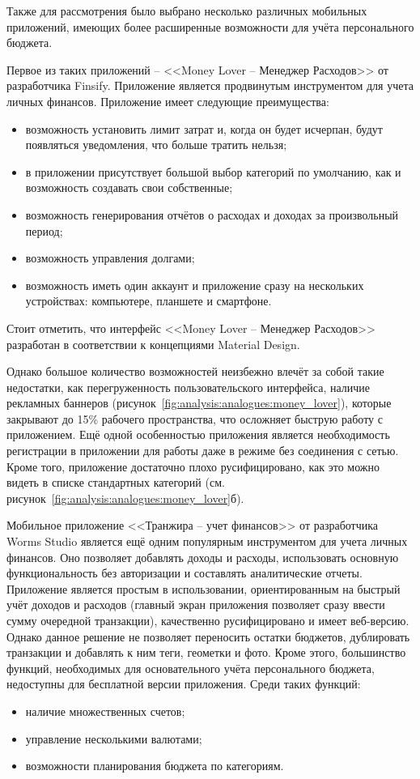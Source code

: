 Также для рассмотрения было выбрано несколько различных мобильных приложений, имеющих более расширенные возможности для учёта персонального бюджета.

Первое из таких приложений -- <<Money Lover -- Менеджер Расходов>> от разработчика Finsify.
Приложение является продвинутым инструментом для учета личных финансов.
Приложение имеет следующие преимущества:
\begin{itemize}
    \item возможность установить лимит затрат и, когда он будет исчерпан, будут появляться уведомления, что больше тратить нельзя;
    \item в приложении присутствует большой выбор категорий по умолчанию, как и возможность создавать свои собственные;
    \item возможность генерирования отчётов о расходах и доходах за произвольный период;
    \item возможность управления долгами;
    \item возможность иметь один аккаунт и приложение сразу на нескольких устройствах: компьютере, планшете и смартфоне.
\end{itemize}

Стоит отметить, что интерфейс <<Money Lover -- Менеджер Расходов>> разработан в соответствии к концепциями Material Design.

Однако большое количество возможностей неизбежно влечёт за собой такие недостатки, как перегруженность пользовательского интерфейса, наличие рекламных баннеров (рисунок~\ref{fig:analysis:analogues:money_lover}), которые закрывают до 15\% рабочего пространства, что осложняет быструю работу с приложением.
Ещё одной особенностью приложения является необходимость регистрации в приложении для работы даже в режиме без соединения с сетью.
Кроме того, приложение достаточно плохо русифицировано, как это можно видеть в списке стандартных категорий (см. рисунок~\ref{fig:analysis:analogues:money_lover}б).

Мобильное приложение <<Транжира -- учет финансов>> от разработчика Worms Studio является ещё одним популярным инструментом для учета личных финансов.
Оно позволяет добавлять доходы и расходы, использовать основную функциональность без авторизации и составлять аналитические отчеты.
Приложение является простым в использовании, ориентированным на быстрый учёт доходов и расходов (главный экран приложения позволяет сразу ввести сумму очередной транзакции), качественно русифицировано и имеет веб-версию.
Однако данное решение не позволяет переносить остатки бюджетов, дублировать транзакции и добавлять к ним теги, геометки и фото.
Кроме этого, большинство функций, необходимых для основательного учёта персонального бюджета, недоступны для бесплатной версии приложения.
Среди таких функций:
\begin{itemize}
    \item наличие множественных счетов;
    \item управление несколькими валютами;
    \item возможности планирования бюджета по категориям.
\end{itemize}

